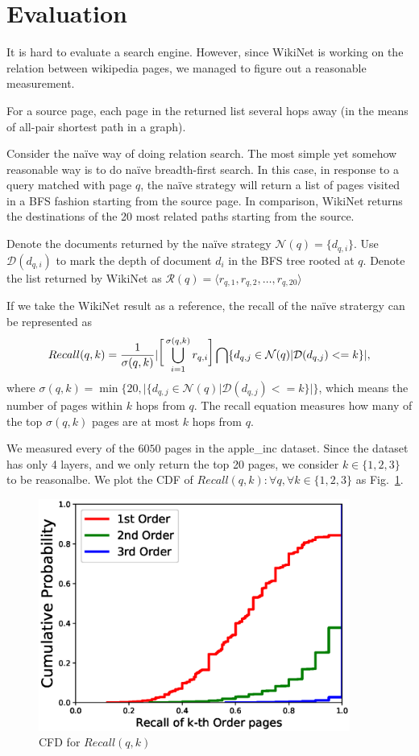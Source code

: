 \documentclass[12pt]{amsart}
\newcommand{\0}{\mat{0}}
\newcommand{\1}{\mathds{1}}
\begin{document}
\section{Evaluation}
\label{sec:eva}
It is hard to evaluate a search engine. However, since WikiNet is working on the relation between wikipedia pages, we managed to figure out a reasonable measurement. 

For a source page, each page in the returned list several hops away (in the means of all-pair shortest path in a graph).  

Consider the na\"ive way of doing relation search. The most simple yet somehow reasonable way is to do na\"ive breadth-first search. In this case, in response to a query matched with page $q$, the na\"ive strategy will return a list of pages visited in a BFS fashion starting from the source page. 
In comparison, WikiNet returns the destinations of the 20 most related paths starting from the source. 

Denote the documents returned by the na\"ive strategy $ \mathcal{N}(q)=\{d_{q,i}\} $. Use $\mathcal{D}(d_{q,i})$  to mark the depth of document $d_i$ in the BFS tree rooted at $q$. Denote the list returned by WikiNet as $\mathcal{R}(q)=\langle r_{q,1},r_{q,2},\dots, r_{q,20}\rangle$

If we take the WikiNet result as a reference, the recall of the na\"ive stratergy can be represented as 
\[
Recall(q,k) = \frac{1}{\sigma(q,k)}
\huge|
\big[\bigcup_{i = 1}^{\sigma(q,k)} r_{q,i} \big]
\bigcap
\{ d_{q,j} \in \mathcal{N}(q) | \mathcal{D}(d_{q,j}) <= k \} 
\huge|,
\]
where $\sigma(q,k) = \min\{20,\big| \{ d_{q,j} \in \mathcal{N}(q) | \mathcal{D}(d_{q,j}) <= k \} \big|\}$, which means the number of pages within $k$ hops from $q$. The recall equation measures how many of the top $\sigma(q,k)$ pages are at most $k$ hops from $q$. 

We measured every of the $6050$ pages in the apple\_inc dataset. Since the dataset has only 4 layers, and we only return the top 20 pages, we consider $k\in \{1,2,3\}$ to be reasonalbe. 
We plot the CDF of $Recall(q,k): \forall q, \forall k \in \{1,2,3\}$ as Fig.~\ref{fig:cdf}. 
\begin{figure}[htb]
\includegraphics[height=3in]{ratio}
\caption{CFD for $Recall(q,k)$}
\label{fig:cdf}
\end{figure}
\end{document}
